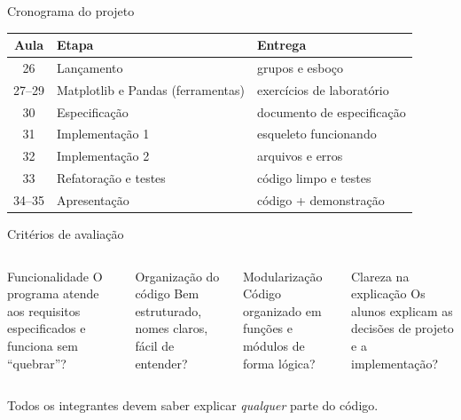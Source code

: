 \documentclass[aspectratio=169,10pt,t]{beamer}
\begin{document}
\begin{frame}{Cronograma do projeto}
  \centering\small
  \begin{tabular}{cll}
    \toprule
    \textbf{Aula} & \textbf{Etapa} & \textbf{Entrega}\\
    \midrule
    26 & Lançamento & grupos e esboço\\
    27--29 & Matplotlib e Pandas (ferramentas) & exercícios de laboratório\\
    30 & Especificação & documento de especificação\\
    31 & Implementação 1 & esqueleto funcionando\\
    32 & Implementação 2 & arquivos e erros\\
    33 & Refatoração e testes & código limpo e testes\\
    34--35 & Apresentação & código + demonstração\\
    \bottomrule
  \end{tabular}
\end{frame}

\begin{frame}{Critérios de avaliação}
  \begin{columns}[T]
    \begin{block}{Funcionalidade}
      O programa atende aos requisitos especificados e funciona sem ``quebrar''?
    \end{block}
    \begin{block}{Organização do código}
      Bem estruturado, nomes claros, fácil de entender?
    \end{block}
    \begin{block}{Modularização}
      Código organizado em funções e módulos de forma lógica?
    \end{block}
    \begin{block}{Clareza na explicação}
      Os alunos explicam as decisões de projeto e a implementação?
    \end{block}
  \end{columns}
  \vspace{1ex}
  \small Todos os integrantes devem saber explicar \emph{qualquer} parte do código.
\end{frame}
\end{document}
